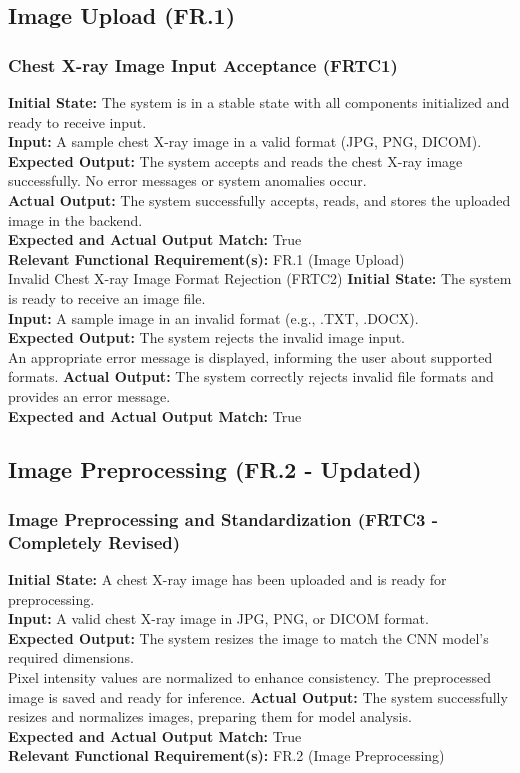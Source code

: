 \documentclass[12pt, titlepage]{article}
\begin{document}
\subsection{Image Upload (FR.1)}
\subsubsection{Chest X-ray Image Input Acceptance (FRTC1)}
\textbf{Initial State:} The system is in a stable state with all components initialized and ready to receive input.\\
\textbf{Input:} A sample chest X-ray image in a valid format (JPG, PNG, DICOM).\\
\textbf{Expected Output:} The system accepts and reads the chest X-ray image successfully.
No error messages or system anomalies occur.\\
\textbf{Actual Output:} The system successfully accepts, reads, and stores the uploaded image in the backend.\\
\textbf{Expected and Actual Output Match:} True\\
\textbf{Relevant Functional Requirement(s):} FR.1 (Image Upload)\\

Invalid Chest X-ray Image Format Rejection (FRTC2)
\textbf{Initial State:} The system is ready to receive an image file.\\
\textbf{Input:} A sample image in an invalid format (e.g., .TXT, .DOCX).\\
\textbf{Expected Output:} The system rejects the invalid image input.\\
An appropriate error message is displayed, informing the user about supported formats.
\textbf{Actual Output:} The system correctly rejects invalid file formats and provides an error message.\\
\textbf{Expected and Actual Output Match:} True\\

\subsection{Image Preprocessing (FR.2 - Updated)}
\subsubsection{Image Preprocessing and Standardization (FRTC3 - Completely Revised)}
\textbf{Initial State:} A chest X-ray image has been uploaded and is ready for preprocessing.\\
\textbf{Input:} A valid chest X-ray image in JPG, PNG, or DICOM format.\\
\textbf{Expected Output:} The system resizes the image to match the CNN model’s required dimensions.\\
Pixel intensity values are normalized to enhance consistency.
The preprocessed image is saved and ready for inference.
\textbf{Actual Output:} The system successfully resizes and normalizes images, preparing them for model analysis.\\
\textbf{Expected and Actual Output Match:} True\\
\textbf{Relevant Functional Requirement(s):} FR.2 (Image Preprocessing)\\
\end{document}
